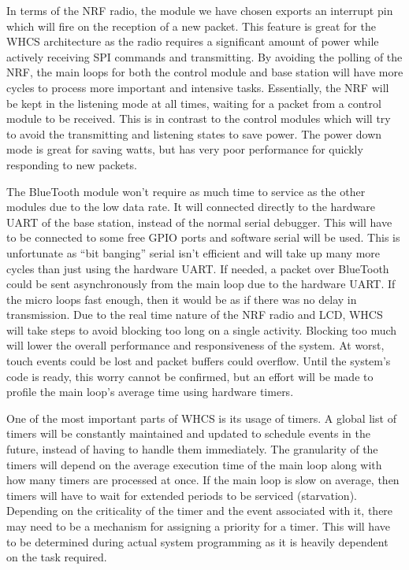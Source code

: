 In terms of the NRF radio, the module we have chosen exports an interrupt pin
which will fire on the reception of a new packet. This feature is great for the
WHCS architecture as the radio requires a significant amount of power
while actively receiving SPI commands and transmitting. By avoiding the polling
of the NRF, the main loops for both the control module and base station will
have more cycles to process more important and intensive tasks. Essentially,
the NRF will be kept in the listening mode at all times, waiting for a packet
from a control module to be received. This is in contrast to the control
modules which will try to avoid the transmitting and listening states to save
power. The power down mode is great for saving watts, but has very poor
performance for quickly responding to new packets.

The BlueTooth module won't require as much time to service as the other modules
due to the low data rate. It will connected directly to the hardware UART of
the base station, instead of the normal serial debugger. This will have to be
connected to some free GPIO ports and software serial will be used. This is
unfortunate as ``bit banging'' serial isn't efficient and will take up many
more cycles than just using the hardware UART. If needed, a packet over
BlueTooth could be sent asynchronously from the main loop due to the hardware
UART. If the micro loops fast enough, then it would be as if there was no delay
in transmission. Due to the real time nature of the NRF radio and LCD, WHCS
will take steps to avoid blocking too long on a single activity. Blocking too
much will lower the overall performance and responsiveness of the system. At
worst, touch events could be lost and packet buffers could overflow. Until the
system's code is ready, this worry cannot be confirmed, but an effort will be
made to profile the main loop's average time using hardware timers.

One of the most important parts of WHCS is its usage of timers. A global list
of timers will be constantly maintained and updated to schedule events
in the future, instead of having to handle them immediately. The granularity of
the timers will depend on the average execution time of the main loop along
with how many timers are processed at once. If the main loop is slow on
average, then timers will have to wait for extended periods to be serviced
(starvation). Depending on the criticality of the timer and the event
associated with it, there may need to be a mechanism for assigning a priority
for a timer. This will have to be determined during actual system programming
as it is heavily dependent on the task required.

